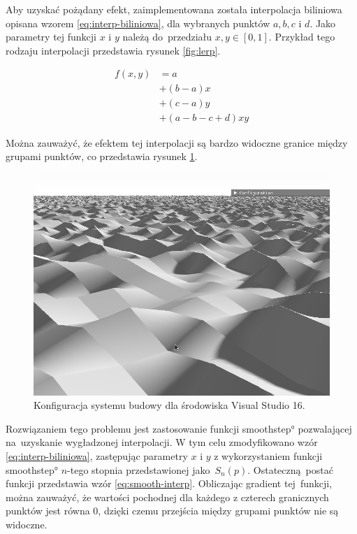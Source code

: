 Aby uzyskać pożądany efekt, zaimplementowana została interpolacja biliniowa opisana wzorem \ref{eq:interp-biliniowa}, dla wybranych punktów $a, b, c$ i $d$. Jako parametry tej funkcji $x$ i $y$ należą do~przedziału $x, y \in [0, 1]$. Przykład tego rodzaju interpolacji przedstawia rysunek \ref{fig:lerp}.

\begin{equation}[H]
\label{eq:interp-biliniowa}
  \begin{split}
    f(x, y) & = a \\
       & + (b - a) x \\
       & + (c - a) y \\
       & + (a - b - c + d) x y
    \end{split}
\end{equation}

Można zauważyć, że efektem tej interpolacji są bardzo widoczne granice między grupami punktów, co przedstawia rysunek \ref{fig:linterp-edges}.

\begin{figure}[H]
\centering
\includegraphics[width=1\textwidth]{./graf/ilin-edges.png}
\caption{Konfiguracja systemu budowy dla środowiska Visual Studio 16.}
\label{fig:linterp-edges}
\end{figure}


Rozwiązaniem tego problemu jest zastosowanie funkcji \ang{smoothstep} pozwalającej na~uzyskanie wygładzonej interpolacji. W tym celu zmodyfikowano wzór \ref{eq:interp-biliniowa}, zastępując parametry $x$ i $y$ z wykorzystaniem funkcji \ang{smoothstep} $n$-tego stopnia przedstawionej jako $S_n(p)$. Ostateczną postać funkcji przedstawia wzór \ref{eq:smooth-interp}. Obliczając gradient tej~funkcji, można zauważyć, że wartości pochodnej dla każdego z czterech granicznych punktów jest równa $0$, dzięki czemu przejścia między grupami punktów nie są widoczne.

